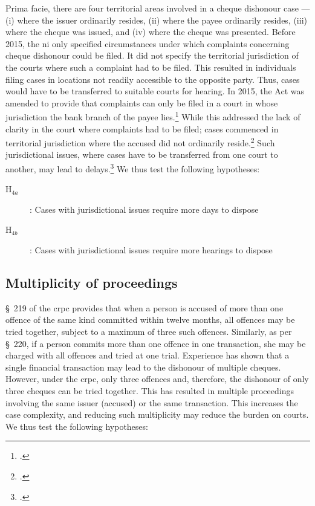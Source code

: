 \documentclass[12pt,a4paper]{article}
\begin{document}
Prima facie, there are four territorial areas involved in a cheque dishonour case --- (i) where the issuer ordinarily resides, (ii) where the payee ordinarily resides, (iii) where the cheque was issued, and (iv) where the cheque was presented. Before 2015, the \gls{ni} only specified circumstances under which complaints concerning cheque dishonour could be filed. It did not specify the territorial jurisdiction of the courts where such a complaint had to be filed. This resulted in individuals filing cases in locations not readily accessible to the opposite party. Thus, cases would have to be transferred to suitable courts for hearing. In 2015, the Act was amended to provide that complaints can only be filed in a court in whose jurisdiction the bank branch of the payee lies.\footcite{niAmend2015} While this addressed the lack of clarity in the court where complaints had to be filed; cases commenced in territorial jurisdiction where the accused did not ordinarily reside.\footcite{amicus2020_submission} Such jurisdictional issues, where cases have to be transferred from one court to another, may lead to delays.\footcite{sc2020_138, amicus2020_submission} We thus test the following hypotheses:

\begin{description}
\item[H$_{4a}$]: Cases with jurisdictional issues require more days to dispose
\item[H$_{4b}$]: Cases with jurisdictional issues require more hearings to dispose
\end{description}

\subsection{Multiplicity of proceedings}

\S~219 of the \gls{crpc} provides that when a person is accused of more than one offence of the same kind committed within twelve months, all offences may be tried together, subject to a maximum of three such offences. Similarly, as per \S~220, if a person commits more than one offence in one transaction, she may be charged with all offences and tried at one trial. Experience has shown that a single financial transaction may lead to the dishonour of multiple cheques. However, under the \gls{crpc}, only three offences and, therefore, the dishonour of only three cheques can be tried together. This has resulted in multiple proceedings involving the same issuer (accused) or the same transaction. This increases the case complexity, and reducing such multiplicity may reduce the burden on courts. We thus test the following hypotheses:
\end{document}

